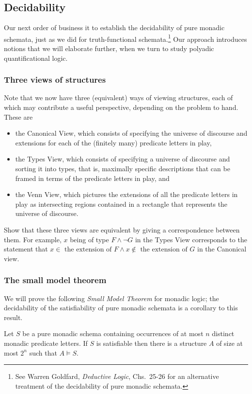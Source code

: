 \subsection{Decidability}

Our next order of business it to establish the decidability of pure monadic schemata, just as we did for truth-functional schemata.\footnote{See Warren Goldfard, \emph{Deductive Logic}, Chs.~25-26 for an alternative treatment of the decidability of pure monadic schemata.}
Our approach introduces notions that we will elaborate further, when we turn to study polyadic quantificational logic.

\subsubsection*{Three views of structures}
Note that we now have three (equivalent) ways of viewing structures, each of which may contribute a useful perspective, depending on the problem to hand. These are
\begin{itemize}
\item 
the Canonical View, which consists of specifying the universe of discourse and extensions for each of the (finitely many) predicate letters in play,
\item 
the Types View, which consists of specifying a universe of discourse and sorting it into types, that is, maximally specific descriptions that can be framed in terms of the predicate letters in play, and
\item 
the Venn View, which pictures the extensions of all the predicate letters in play as intersecting regions contained in a rectangle that represents the universe of discourse.
\end{itemize}

\begin{aside}
    Show that these three views are equivalent by giving a correspondence between them. For example, $x$ being of type $F \land \lnot G$ in the Types View corresponds to the statement that $x \in\mbox{ the extension of } F \land x \not \in\mbox{ the extension of } G$ in the Canonical view. 
\end{aside}

\subsubsection*{The small model theorem}
We will prove the following \emph{Small Model Theorem} for monadic logic; the decidability of the satisfiability of pure monadic schemata is a corollary to this result. 
\begin{theorem}\label{smm-thm}
Let $S$ be a pure monadic schema containing occurrences of at most $n$ distinct monadic predicate letters. If $S$ is satisfiable then there is a structure $A$ of size at most $2^n$ such that $A\models S$.
\end{theorem}

